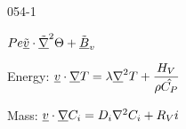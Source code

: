 \begin{mitframe}{054-1}
\begin{listone}
	\item $\peclet\uline{\tilde{\vvel}}\cdot\tilde{\gradop}^2\dimltemp+\tilde{\magind}_{\vvel}$
    		\begin{listtwo}
            	\item Energy: $\uline{\vvel}\cdot\gradop\Temp=\wavel\gradop^2\Temp+\dfrac{\energysource}{\dens\hat{\cp}}$
                \item Mass: $\uline{\vvel}\cdot\gradop\conc_{\state}=\pdiff\nabla^2\conc_{\state}+\specsource{i}$

\end{listtwo}
\end{listone}
\end{mitframe}